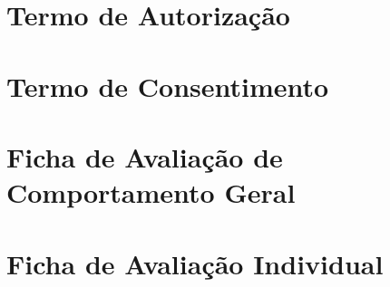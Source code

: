 \documentclass[
	12pt,				%
    oneside,			%
	a4paper,			%
	english,			%
	french,				%
	spanish,			%
	brazil,				%
	]{abntex2}
\begin{document}
%
%
\begin{apendicesenv}
\partapendices
\chapter{Termo de Autorização}

\chapter{Termo de Consentimento}

\chapter{Ficha de Avaliação de Comportamento Geral}

\chapter{Ficha de Avaliação Individual}

\end{apendicesenv}
	
\end{document}

